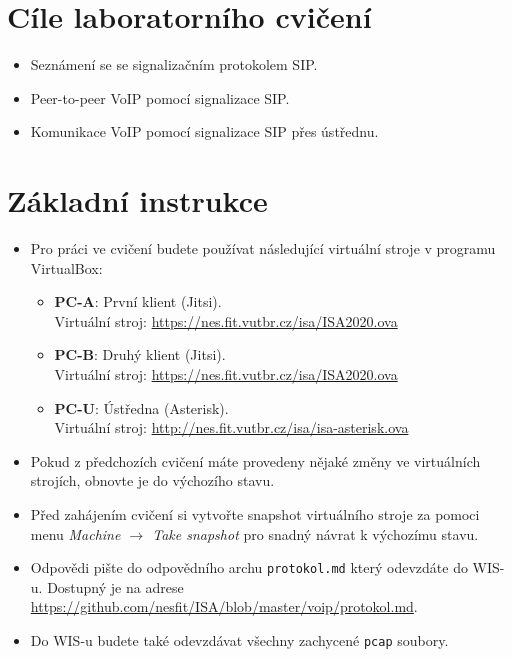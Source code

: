 \section*{Cíle laboratorního cvičení}
\begin{itemize}
  \item Seznámení se se signalizačním protokolem SIP.
  \item Peer-to-peer VoIP pomocí signalizace SIP.
  \item Komunikace VoIP pomocí signalizace SIP přes ústřednu.
\end{itemize}

\section*{Základní instrukce}
\begin{itemize}
  \item Pro práci ve cvičení budete používat následující virtuální stroje v programu VirtualBox:
  \begin{itemize}
	\item \textbf{PC-A}: První klient (Jitsi).\\
	Virtuální stroj: \url{https://nes.fit.vutbr.cz/isa/ISA2020.ova}
	\item \textbf{PC-B}: Druhý klient (Jitsi).\\
	Virtuální stroj: \url{https://nes.fit.vutbr.cz/isa/ISA2020.ova}
	\item \textbf{PC-U}: Ústředna (Asterisk).\\
	Virtuální stroj: \url{http://nes.fit.vutbr.cz/isa/isa-asterisk.ova}
  \end{itemize}
  \item Pokud z předchozích cvičení máte provedeny nějaké změny ve virtuálních strojích, obnovte je do výchozího stavu.
  \item Před zahájením cvičení si vytvořte snapshot virtuálního stroje za pomoci
  menu \textit{Machine $\rightarrow$ Take snapshot} pro snadný návrat k výchozímu stavu.
  \item Odpovědi pište do odpovědního archu \texttt{protokol.md} který odevzdáte do WIS-u.
  Dostupný je na adrese \url{https://github.com/nesfit/ISA/blob/master/voip/protokol.md}.
  \item Do WIS-u budete také odevzdávat všechny zachycené \texttt{pcap} soubory.
\end{itemize}

